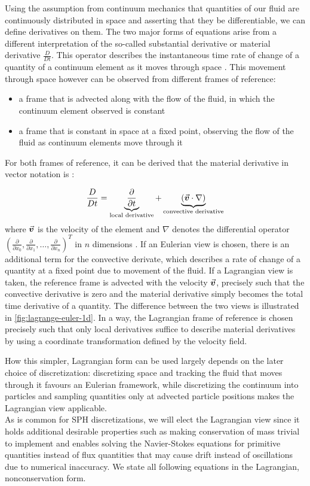 Using the assumption from continuum mechanics that quantities of our fluid are continuously distributed in space and asserting that they be differentiable, we can define derivatives on them. The two major forms of equations arise from a different interpretation of the so-called substantial derivative\autocite*{anderson} or material derivative\autocite*{tutorial} $\frac{D}{Dt}$. This operator describes the instantaneous time rate of change of a quantity of a continuum element as it moves through space \autocite*{anderson}. This movement through space however can be observed from different frames of reference:
\begin{itemize}
    \item a frame that is advected along with the flow of the fluid, in which the continuum element observed is constant
    \item a frame that is constant in space at a fixed point, observing the flow of the fluid as continuum elements move through it
\end{itemize}

For both frames of reference, it can be derived that the material derivative in vector notation is \autocite*{anderson}:

\begin{align}
    \frac{D}{Dt} = \underbrace{\frac{\partial }{\partial t}}_{\text{local derivative}} + \underbrace{(\vec{\bm{v}}\cdot \nabla)}_{\text{convective derivative}}
\end{align}
where $\vec{\bm{v}}$ is the velocity of the element and $\nabla$ denotes the differential operator $\left(\frac{\partial}{\partial x_0}, \frac{\partial}{\partial x_1}, \dots,  \frac{\partial}{\partial x_n}\right)^T$ in $n$ dimensions \autocite*{anderson}. If an Eulerian view is chosen, there is an additional term for the convective derivate, which describes a rate of change of a quantity at a fixed point due to movement of the fluid. If a Lagrangian view is taken, the reference frame is advected with the velocity $\vec{\bm{v}}$, precisely such that the convective derivative is zero and the material derivative simply becomes the total time derivative of a quantity. The difference between the two views is illustrated in \autoref{fig:lagrange-euler-1d}. In a way, the Lagrangian frame of reference is chosen precisely such that only local derivatives suffice to describe material derivatives by using a coordinate transformation defined by the velocity field.

How this simpler, Lagrangian form can be used largely depends on the later choice of discretization: discretizing space and tracking the fluid that moves through it favours an Eulerian framework, while discretizing the continuum into particles and sampling quantities only at advected particle positions makes the Lagrangian view applicable.\\
As is common for SPH discretizations, we will elect the Lagrangian view since it holds additional desirable properties such as making conservation of mass trivial to implement and enables solving the Navier-Stokes equations for primitive quantities instead of flux quantities that may cause drift instead of oscillations due to numerical inaccuracy. We state all following equations in the Lagrangian, nonconservation form.

